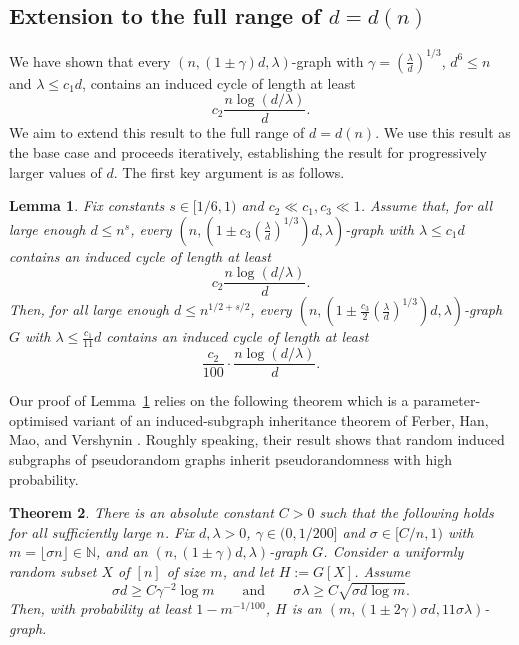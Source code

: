 \documentclass[reqno,a4paper]{amsart}
\newtheorem{theorem}{Theorem}[section]
\newtheorem{lemma}[theorem]{Lemma}
\theoremstyle{definition}
\begin{document}
\subsection{Extension to the full range of \texorpdfstring{$d=d(n)$}{d=d(n)}}\label{s: full d}

We have shown that every $(n, (1\pm\gamma)d, \lambda)$-graph with $\gamma=\left(\frac{\lambda}{d}\right)^{1/3}$, $d^6\le n$ and $\lambda\le c_1 d$, contains an induced cycle of length at least
\[
    c_2\frac{n\log(d/\lambda)}{d}.
\]
We aim to extend this result to the full range of $d=d(n)$. We use this result as the base case and proceeds iteratively, establishing the result for progressively larger values of $d$. The first key argument is as follows.

\begin{lemma}\label{lem: iteration_1}
Fix constants $s\in [1/6,1)$ and $c_2\ll c_1,c_3\ll 1$.
Assume that, for all large enough $d\le n^s$, 
every $\left(n,\left(1\pm c_3(\frac{\lambda}{d})^{1/3}\right)d,\lambda\right)$-graph with $\lambda\le c_1 d$ contains an induced cycle of length at least
    \[
        c_2\frac{n\log(d/\lambda)}{d}.
    \] 
Then, for all large enough $d\le n^{1/2+s/2}$, every $\left(n,\left(1\pm \frac{c_3}{2}(\frac{\lambda}{d})^{1/3}\right)d,\lambda\right)$-graph $G$ with $\lambda\le \frac{c_1}{11} d$ contains an induced cycle of length at least
    \[
        \frac{c_2}{100}\cdot \frac{n\log\left(d/\lambda\right)}{d}.
    \] 
\end{lemma}

Our proof of Lemma~\ref{lem: iteration_1} relies on the following theorem which is a parameter-optimised variant of an induced-subgraph inheritance theorem of Ferber, Han, Mao, and Vershynin \cite[Theorem 6.2]{FHMV25}. Roughly speaking, their result shows that random induced subgraphs of pseudorandom graphs inherit pseudorandomness with high probability.

\begin{theorem}\label{thm:patched} 
There is an absolute constant $C>0$ such that the following holds for all sufficiently large $n$.
Fix $d,\lambda>0$, $\gamma\in(0,1/200]$ and $\sigma\in [C/n,1)$ with $m=\lfloor \sigma n\rfloor \in\mathbb N$, and an $(n,(1\pm\gamma)d,\lambda)$-graph $G$. 
Consider a uniformly random subset $X$ of $[n]$ of size $m$, and let $H:=G[X]$. Assume
\begin{equation}\label{eq:patched-hypotheses}
        \sigma d\ge C\gamma^{-2}\log m
        \qquad \text{and}\qquad
        \sigma\lambda\ge C\sqrt{\sigma d\log m}.
\end{equation}
Then, with probability at least $1-m^{-1/100}$, $H$ is an $(m,(1\pm2\gamma)\sigma d,11\sigma\lambda)$-graph.
\end{theorem}
\end{document}
